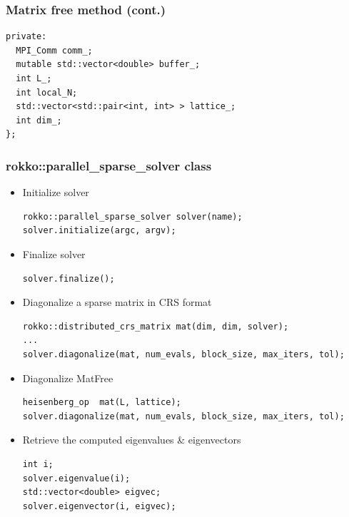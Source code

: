 \begin{frame}[c,fragile]
  \frametitle{Matrix free method (cont.)}
\begin{lstlisting}
private:
  MPI_Comm comm_;
  mutable std::vector<double> buffer_;
  int L_;
  int local_N;
  std::vector<std::pair<int, int> > lattice_;
  int dim_;
};
\end{lstlisting}
\end{frame}


\begin{frame}[c,fragile]
  \frametitle{rokko::parallel_sparse_solver class}
\vspace{-1\baselineskip}
  \begin{itemize}
  \item Initialize solver
\begin{lstlisting}
rokko::parallel_sparse_solver solver(name);
solver.initialize(argc, argv);
\end{lstlisting}
  \item Finalize solver
\begin{lstlisting}
solver.finalize();
\end{lstlisting}
  \item Diagonalize a sparse matrix in CRS format
\begin{lstlisting}
rokko::distributed_crs_matrix mat(dim, dim, solver);
...
solver.diagonalize(mat, num_evals, block_size, max_iters, tol);
\end{lstlisting}
  \item Diagonalize MatFree
\begin{lstlisting}
heisenberg_op  mat(L, lattice);
solver.diagonalize(mat, num_evals, block_size, max_iters, tol);
\end{lstlisting}
  \item Retrieve the computed eigenvalues \& eigenvectors
\begin{lstlisting}
int i;
solver.eigenvalue(i);
std::vector<double> eigvec;
solver.eigenvector(i, eigvec);
\end{lstlisting}
  \end{itemize}
\end{frame}


